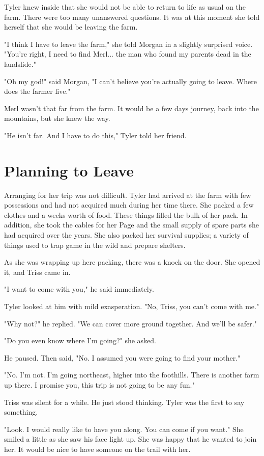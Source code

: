 \documentclass[courier]{sffms}
\begin{document}
Tyler knew inside that she would not be
able to return to life as usual on the farm.
There were too many unanswered questions.
It was at this moment she told herself
that she would be leaving the farm.

"I think I have to leave the farm," she told
Morgan in a slightly surprised voice. "You're
right, I need to find Merl... the man who 
found my parents dead in the landslide."

"Oh my god!" said Morgan, "I can't believe
you're actually going to leave. Where does
the farmer live."

Merl wasn't that far from the farm. It would
be a few days journey, back into the mountains,
but she knew the way.

"He isn't far. And I have to do this," Tyler told 
her friend.

\chapter{Planning to Leave}
Arranging for her trip was not difficult. Tyler
had arrived at the farm with few possessions
and had not acquired much during her time 
there. She packed a few clothes and a weeks
worth of food. These things filled the bulk
of her pack. In addition, she took the cables
for her Page and the small supply of spare
parts she had acquired over the years. She
also packed her survival supplies; a variety
of things used to trap game in the wild and
prepare shelters.

As she was wrapping up here packing, there
was a knock on the door. She opened it, and
Triss came in.

"I want to come with you," he said immediately.

Tyler looked at him with mild exasperation. "No,
Triss, you can't come with me."

"Why not?" he replied. "We can cover more
ground together. And we'll be safer."

"Do you even know where I'm going?" she asked.

He paused. Then said, "No. I assumed you were
going to find your mother."

"No. I'm not. I'm going northeast, higher into the
foothills. There is another farm up there. I promise
you, this trip is not going to be any fun."

Triss was silent for a while. He just stood thinking.
Tyler was the first to say something.

"Look. I would really like to have you along. You
can come if you want." She smiled a little as she
saw his face light up. She was happy that he wanted
to join her. It would be nice to have someone on
the trail with her.
\end{document}
